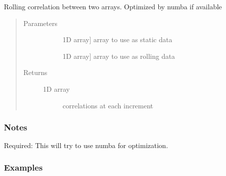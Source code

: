 \documentclass[letterpaper,10pt,english]{sphinxmanual}
\begin{document}
\begin{fulllineitems}
\label{\detokenize{generated/seg1d.optimized_funcs.vcor:seg1d.optimized_funcs.vcor}}
\sphinxAtStartPar
Rolling correlation between two arrays.
Optimized by numba if available
\begin{quote}\begin{description}
\item[{Parameters}] \leavevmode\begin{description}
\item[{}] \leavevmode{[}1D array{]}
\sphinxAtStartPar
array to use as static data

\item[{}] \leavevmode{[}1D array{]}
\sphinxAtStartPar
array to use as rolling data

\end{description}

\item[{Returns}] \leavevmode\begin{description}
\item[{1D array}] \leavevmode
\sphinxAtStartPar
correlations at each increment

\sphinxAtStartPar
{}

\end{description}

\end{description}\end{quote}
\subsubsection*{Notes}

\sphinxAtStartPar
Required: 
This will try to use numba for optimization.
\subsubsection*{Examples}

\begin{sphinxVerbatim}[commandchars=\\\{\}]
   
   
\end{sphinxVerbatim}


\end{fulllineitems}
\end{document}
